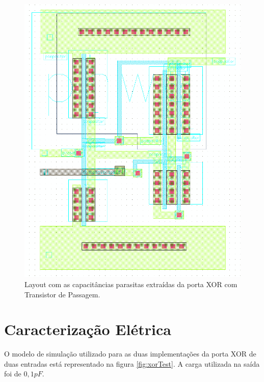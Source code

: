 \documentclass[a4paper,10pt] {article}
\begin{document}
\begin{figure}[h]
\begin{minipage} [b] {0.48 \linewidth}
	\includegraphics[scale=0.2]{xorTransGateExtracted.png}
	\caption{Layout com as capacitâncias parasitas extraídas da porta XOR com Transistor de Passagem.}
	\label{fig:xorTransExtracted}
  \end{minipage}
\end{figure}



\section{Caracterização Elétrica}
\label{sec:caracterizacao}
O modelo de simulação utilizado para as duas implementações da porta XOR de duas entradas está representado na figura \ref{fig:xorTest}. A carga utilizada na saída foi de $0,1pF$.
\end{document}
